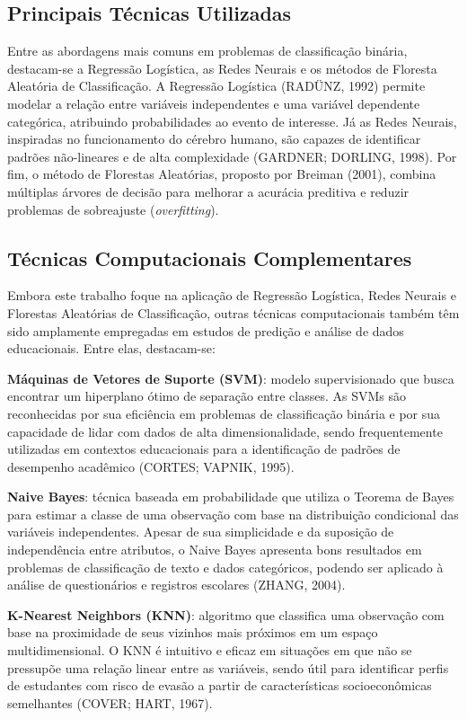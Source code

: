 \documentclass[english, spanish, brazilian]{RBIEarticle} %
\begin{document}
\subsection{Principais Técnicas Utilizadas}
Entre as abordagens mais comuns em problemas de classificação binária, destacam-se a Regressão Logística, as Redes Neurais e os métodos de Floresta Aleatória de Classificação. A Regressão Logística (RADÜNZ, 1992) permite modelar a relação entre variáveis independentes e uma variável dependente categórica, atribuindo probabilidades ao evento de interesse. Já as Redes Neurais, inspiradas no funcionamento do cérebro humano, são capazes de identificar padrões não-lineares e de alta complexidade (GARDNER; DORLING, 1998). Por fim, o método de Florestas Aleatórias, proposto por Breiman (2001), combina múltiplas árvores de decisão para melhorar a acurácia preditiva e reduzir problemas de sobreajuste (\textit{overfitting}).

\subsection{Técnicas Computacionais Complementares}
Embora este trabalho foque na aplicação de Regressão Logística, Redes Neurais e Florestas Aleatórias de Classificação, outras técnicas computacionais também têm sido amplamente empregadas em estudos de predição e análise de dados educacionais. Entre elas, destacam-se:

\textbf{Máquinas de Vetores de Suporte (SVM)}: modelo supervisionado que busca encontrar um hiperplano ótimo de separação entre classes. As SVMs são reconhecidas por sua eficiência em problemas de classificação binária e por sua capacidade de lidar com dados de alta dimensionalidade, sendo frequentemente utilizadas em contextos educacionais para a identificação de padrões de desempenho acadêmico (CORTES; VAPNIK, 1995).

\textbf{Naive Bayes}: técnica baseada em probabilidade que utiliza o Teorema de Bayes para estimar a classe de uma observação com base na distribuição condicional das variáveis independentes. Apesar de sua simplicidade e da suposição de independência entre atributos, o Naive Bayes apresenta bons resultados em problemas de classificação de texto e dados categóricos, podendo ser aplicado à análise de questionários e registros escolares (ZHANG, 2004).

\textbf{K-Nearest Neighbors (KNN)}: algoritmo que classifica uma observação com base na proximidade de seus vizinhos mais próximos em um espaço multidimensional. O KNN é intuitivo e eficaz em situações em que não se pressupõe uma relação linear entre as variáveis, sendo útil para identificar perfis de estudantes com risco de evasão a partir de características socioeconômicas semelhantes (COVER; HART, 1967).
\end{document}
